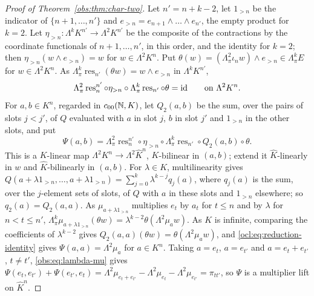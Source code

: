 \begin{proof}[Proof of Theorem~\ref{obs:thm:char-two}]
Let $n'=n+k-2$, let $1_{>n}$ be the indicator of $\{n+1,\dots,n'\}$ and $e_{>n}=e_{n+1}\wedge\dots\wedge e_{n'}$, the
empty product for $k=2$. Let $\eta_{>n}\colon\Lambda^kK^{n'}\to\Lambda^2K^{n'}$ be the composite of the contractions by
the coordinate functionals of $n+1,\dots,n'$, in this order, and the identity for $k=2$; then
$\eta_{>n}(w\wedge e_{>n})=w$ for $w\in\Lambda^2K^n$. Put $\theta(w)=(\Lambda^2_\pi\iota_nw)\wedge
e_{>n}\in\Lambda^k_\pi E$ for $w\in\Lambda^2K^n$. As $\Lambda^k_\pi\operatorname{res}_{n'}(\theta w)=w\wedge e_{>n}$ in
$\Lambda^kK^{n'}$,
\begin{equation}\label{ocl:eq:reduction-identity}
\Lambda^2_\pi\operatorname{res}^{n'}_n\circ\eta_{>n}\circ\Lambda^k_\pi\operatorname{res}_{n'}\circ\theta=\mathrm{id}
\qquad\text{on }\Lambda^2K^n.
\end{equation}
For $a,b\in K^n$, regarded in $c_{00}(\mathbb N,K)$, let $Q_2(a,b)$ be the sum, over the pairs of slots $j<j'$, of $Q$
evaluated with $a$ in slot $j$, $b$ in slot $j'$ and $1_{>n}$ in the other slots, and put
\begin{equation}\label{ocl:eq:reduced-lift}
\Psi(a,b)=\Lambda^2_\pi\operatorname{res}^{n'}_n\circ\eta_{>n}\circ\Lambda^k_\pi\operatorname{res}_{n'}\circ
Q_2(a,b)\circ\theta .
\end{equation}
This is a $K$-linear map $\Lambda^2K^n\to\Lambda^2\widehat K^n$, $K$-bilinear in $(a,b)$; extend it $\widehat K$-linearly
in $w$ and $\widehat K$-bilinearly in $(a,b)$. For $\lambda\in K$, multilinearity gives
$Q(a+\lambda1_{>n},\dots,a+\lambda1_{>n})=\sum_{j=0}^k\lambda^{k-j}q_j(a)$, where $q_j(a)$ is the sum, over the
$j$-element sets of slots, of $Q$ with $a$ in these slots and $1_{>n}$ elsewhere; so $q_2(a)=Q_2(a,a)$. As
$\mu_{a+\lambda1_{>n}}$ multiplies $e_t$ by $a_t$ for $t\le n$ and by $\lambda$ for $n<t\le n'$,
$\Lambda^k_\pi\mu_{a+\lambda1_{>n}}(\theta w)=\lambda^{k-2}\theta(\Lambda^2\mu_aw)$. As $K$ is infinite, comparing the
coefficients of $\lambda^{k-2}$ gives $Q_2(a,a)(\theta w)=\theta(\Lambda^2\mu_aw)$, and
\eqref{ocl:eq:reduction-identity} gives $\Psi(a,a)=\Lambda^2\mu_a$ for $a\in K^n$. Taking $a=e_t$, $a=e_{t'}$ and
$a=e_t+e_{t'}$, $t\ne t'$, \eqref{obs:eq:lambda-mu} gives
$\Psi(e_t,e_{t'})+\Psi(e_{t'},e_t)=\Lambda^2\mu_{e_t+e_{t'}}-\Lambda^2\mu_{e_t}-\Lambda^2\mu_{e_{t'}}=\pi_{tt'}$, so
$\Psi$ is a multiplier lift on $\widehat K^n$.


\end{proof}
